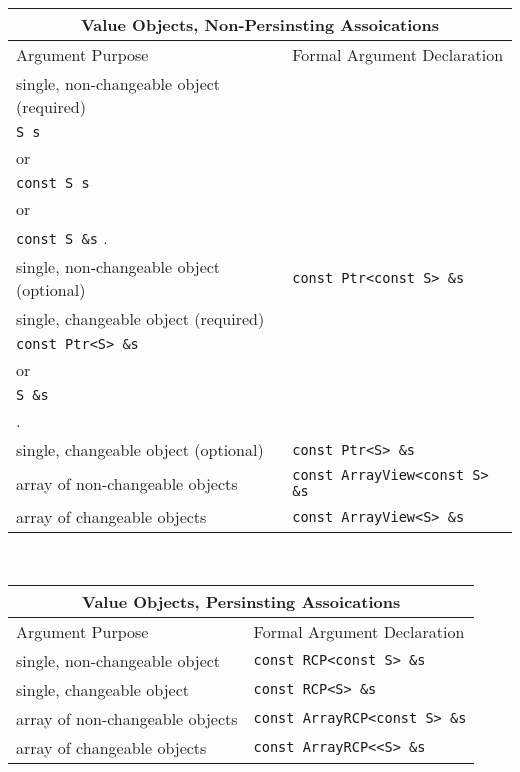 \begin{tabular}{|l|l|}
%
\multicolumn{2}{c}{\textbf{Value Objects, Non-Persinsting Assoications}} \\
%
\hline
Argument Purpose
& Formal Argument Declaration \\
\hline
\hline
single, non-changeable object (required)
& \begin{minipage}{12ex}
    {\tiny .}\\
    {}\texttt{S s} \\
    or \\
    {}\texttt{const S s} \\
    or \\
    {}\texttt{const S \&s}
    {\tiny .}
  \end{minipage} \\
\hline
single, non-changeable object (optional)
& {}\texttt{const Ptr<const S> \&s} \\
\hline
single, changeable object (required)
& \begin{minipage}{20ex}
    {\tiny .}\\
    {}\texttt{const Ptr<S> \&s} \\
    or \\
    {}\texttt{S \&s} \\
    {\tiny .}
  \end{minipage} \\
\hline
single, changeable object (optional)
& \texttt{const Ptr<S> \&s} \\
\hline
array of non-changeable objects
& {}\texttt{const ArrayView<const S> \&s} \\
\hline
array of changeable objects
& {}\texttt{const ArrayView<S> \&s} \\
\hline
%
\end{tabular} \\[3ex]
%
\begin{tabular}{|l|l|}
%
\multicolumn{2}{c}{\textbf{Value Objects, Persinsting Assoications}} \\
%
\hline
Argument Purpose
& Formal Argument Declaration \\
\hline
\hline
single, non-changeable object
& {}\texttt{const RCP<const S> \&s} \\
\hline
single, changeable object
& {}\texttt{const RCP<S> \&s} \\
\hline
array of non-changeable objects
& {}\texttt{const ArrayRCP<const S> \&s} \\
\hline
array of changeable objects
& {}\texttt{const ArrayRCP<<S> \&s} \\
\hline
\end{tabular}
